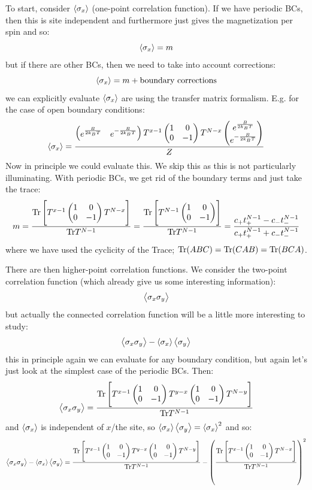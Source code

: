 To start, consider $\left< \sigma_x \right>$ (one-point correlation function). If we have periodic BCs, then this is site independent and furthermore just gives the magnetization per spin and so:
\begin{equation}
    \left< \sigma_x \right> = m
\end{equation}
but if there are other BCs, then we need to take into account corrections:
\begin{equation}
    \left< \sigma_x \right> = m + \text{boundary corrections}
\end{equation}
we can explicitly evaluate $\left< \sigma_x \right>$ are using the transfer matrix formalism. E.g. for the case of open boundary conditions:
\begin{equation}
    \left< \sigma_x \right> = \frac{\begin{pmatrix}e^{\frac{B}{2k_B T}} & e^{-\frac{B}{2k_B T}}\end{pmatrix} T^{x-1} \begin{pmatrix}1 & 0 \\ 0 & -1\end{pmatrix} T^{N - x} \begin{pmatrix}e^{\frac{B}{2k_ B T}} \\ e^{-\frac{B}{2k_B T}}\end{pmatrix}}{Z}
\end{equation}
Now in principle we could evaluate this. We skip this as this is not particularly illuminating. With periodic BCs, we get rid of the boundary terms and just take the trace:
\begin{equation}
    m = \frac{\mathrm{Tr}\left[ T^{x-1} \begin{pmatrix}1 & 0 \\ 0 & -1\end{pmatrix} T^{N - x}\right]}{\mathrm{Tr} T^{N-1}} = \frac{\mathrm{Tr}\left[ T^{N-1} \begin{pmatrix}1 & 0 \\ 0 & -1\end{pmatrix}\right]}{\mathrm{Tr} T^{N-1}} = \frac{c_+t_+^{N-1} - c_-t_-^{N-1}}{c_+t_+^{N-1} + c_-t_-^{N-1}}
\end{equation}
where we have used the cyclicity of the Trace; $\mathrm{Tr}(ABC) = \mathrm{Tr}(CAB) = \mathrm{Tr}(BCA)$. 

There are then higher-point correlation functions. We consider the two-point correlation function (which already give us some interesting information):
\begin{equation}
    \left< \sigma_x \sigma_y \right>
\end{equation}
but actually the connected correlation function will be a little more interesting to study:
\begin{equation}
    \left< \sigma_x \sigma_y \right> - \left< \sigma_x \right>\left< \sigma_y \right>
\end{equation}
this in principle again we can evaluate for any boundary condition, but again let's just look at the simplest case of the periodic BCs. Then:
\begin{equation}
    \left< \sigma_x\sigma_y \right> = \frac{\mathrm{Tr}\left[T^{x-1}\begin{pmatrix} 1 & 0 \\ 0 & -1 \end{pmatrix} T^{y-x} \begin{pmatrix} 1 & 0 \\ 0 & -1 \end{pmatrix} T^{N-y}\right]}{\mathrm{Tr} T^{N-1}}
\end{equation}
and $\left< \sigma_x \right>$ is independent of $x$/the site, so $\left< \sigma_x \right>\left< \sigma_y \right> = \left< \sigma_x \right>^2$ and so:
\begin{equation}
    \left< \sigma_x \sigma_y \right> - \left< \sigma_x \right>\left< \sigma_y \right> = \frac{\mathrm{Tr}\left[T^{x-1}\begin{pmatrix} 1 & 0 \\ 0 & -1 \end{pmatrix} T^{y-x} \begin{pmatrix} 1 & 0 \\ 0 & -1 \end{pmatrix} T^{N-y}\right]}{\mathrm{Tr} T^{N-1}} -  \left(\frac{\mathrm{Tr}\left[ T^{x-1} \begin{pmatrix}1 & 0 \\ 0 & -1\end{pmatrix} T^{N - x}\right]}{\mathrm{Tr} T^{N-1}}\right)^{2}
\end{equation}

